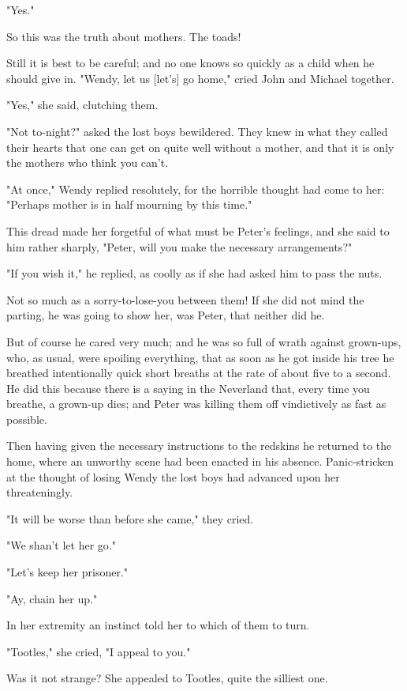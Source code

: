 "Yes."


So this was the truth about mothers. The toads!


Still it is best to be careful; and no one knows so quickly as a child
when he should give in. "Wendy, let us [let's] go home," cried John and
Michael together.


"Yes," she said, clutching them.


"Not to-night?" asked the lost boys bewildered. They knew in what they
called their hearts that one can get on quite well without a mother, and
that it is only the mothers who think you can't.


"At once," Wendy replied resolutely, for the horrible thought had come to
her: "Perhaps mother is in half mourning by this time."


This dread made her forgetful of what must be Peter's feelings, and she
said to him rather sharply, "Peter, will you make the necessary
arrangements?"


"If you wish it," he replied, as coolly as if she had asked him to pass
the nuts.


Not so much as a sorry-to-lose-you between them! If she did not mind the
parting, he was going to show her, was Peter, that neither did he.


But of course he cared very much; and he was so full of wrath against
grown-ups, who, as usual, were spoiling everything, that as soon as he got
inside his tree he breathed intentionally quick short breaths at the rate
of about five to a second. He did this because there is a saying in the
Neverland that, every time you breathe, a grown-up dies; and Peter was
killing them off vindictively as fast as possible.


Then having given the necessary instructions to the redskins he returned
to the home, where an unworthy scene had been enacted in his absence.
Panic-stricken at the thought of losing Wendy the lost boys had advanced
upon her threateningly.


"It will be worse than before she came," they cried.


"We shan't let her go."


"Let's keep her prisoner."


"Ay, chain her up."


In her extremity an instinct told her to which of them to turn.


"Tootles," she cried, "I appeal to you."


Was it not strange? She appealed to Tootles, quite the silliest one.


